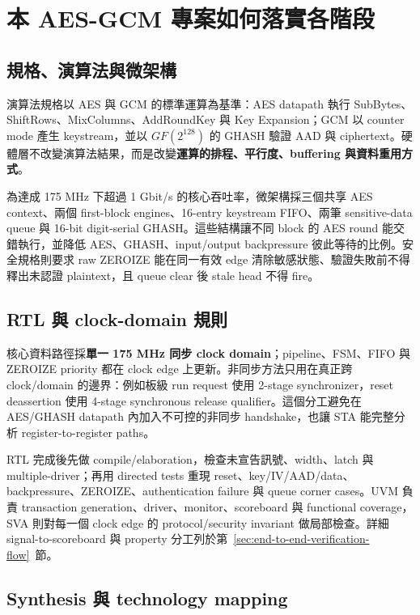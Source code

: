 \documentclass[UTF8,fontset=none,11pt,a4paper]{ctexrep}
\newcommand{\code}[1]{\texttt{\detokenize{#1}}}
\begin{document}
\section{本 AES-GCM 專案如何落實各階段}

\subsection{規格、演算法與微架構}

演算法規格以 AES 與 GCM 的標準運算為基準：AES datapath 執行 SubBytes、ShiftRows、MixColumns、AddRoundKey 與 Key Expansion；GCM 以 counter mode 產生 keystream，並以 $GF(2^{128})$ 的 GHASH 驗證 AAD 與 ciphertext。硬體層不改變演算法結果，而是改變\textbf{運算的排程、平行度、buffering 與資料重用方式}。

為達成 175 MHz 下超過 1 Gbit/s 的核心吞吐率，微架構採三個共享 AES context、兩個 first-block engines、16-entry keystream FIFO、兩筆 sensitive-data queue 與 16-bit digit-serial GHASH。這些結構讓不同 block 的 AES round 能交錯執行，並降低 AES、GHASH、input/output backpressure 彼此等待的比例。安全規格則要求 raw ZEROIZE 能在同一有效 edge 清除敏感狀態、驗證失敗前不得釋出未認證 plaintext，且 queue clear 後 stale head 不得 fire。

\subsection{RTL 與 clock-domain 規則}

核心資料路徑採\textbf{單一 175 MHz 同步 clock domain}；pipeline、FSM、FIFO 與 ZEROIZE priority 都在 clock edge 上更新。非同步方法只用在真正跨 clock/domain 的邊界：例如板級 run request 使用 2-stage \code{ASYNC\_REG} synchronizer，reset deassertion 使用 4-stage synchronous release qualifier。這個分工避免在 AES/GHASH datapath 內加入不可控的非同步 handshake，也讓 STA 能完整分析 register-to-register paths。

RTL 完成後先做 compile/elaboration，檢查未宣告訊號、width、latch 與 multiple-driver；再用 directed tests 重現 reset、key/IV/AAD/data、backpressure、ZEROIZE、authentication failure 與 queue corner cases。UVM 負責 transaction generation、driver、monitor、scoreboard 與 functional coverage，SVA 則對每一個 clock edge 的 protocol/security invariant 做局部檢查。詳細 signal-to-scoreboard 與 property 分工列於第~\ref{sec:end-to-end-verification-flow}~節。

\subsection{Synthesis 與 technology mapping}
\end{document}
